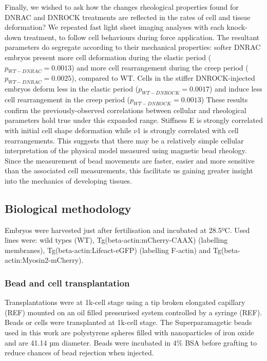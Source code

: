 Finally, we wished to ask how the changes rheological properties found for DNRAC and DNROCK treatments are reflected in the rates of cell and tissue deformation?
We repeated fast light sheet imaging analyses with each knock-down treatment, to follow cell behaviours during force application.
The resultant parameters do segregate according to their mechanical properties: softer DNRAC embryos present more cell deformation during the elastic period ($p_{WT-DNRAC} = 0.0013$) and more cell rearrangement during the creep period ($p_{WT-DNRAC} = 0.0025$), compared to WT.
Cells in the stiffer DNROCK-injected embryos deform less in the elastic period ($p_{WT-DNROCK} = 0.0017$) and induce less cell rearrangement in the creep period ($p_{WT-DNROCK} = 0.0013$) %
These results confirm the previously-observed correlations between cellular and rheological parameters hold true under this expanded range.
Stiffness E is strongly correlated with initial cell shape deformation while $\nu$1 is strongly correlated with cell rearrangements.
This suggests that there may be a relatively simple cellular interpretation of the physical model measured using magnetic bead rheology.
Since the measurement of bead movements are faster, easier and more sensitive than the associated cell measurements, this facilitate us gaining greater insight into the mechanics of developing tissues.

\subsection{Biological methodology}
Embryos were harvested just after fertilisation and incubated at 28.5ºC.
Used lines were: wild types (WT), Tg(beta-actin:mCherry-CAAX) (labelling membranes), Tg(beta-actin:Lifeact-eGFP) (labelling F-actin) and Tg(beta-actin:Myosin2-mCherry).

\subsubsection{Bead and cell transplantation}
Transplantations were at 1k-cell stage using a tip broken elongated capillary (REF) mounted on an oil filled pressurised system controlled by a syringe (REF).
Beads or cells were transplanted at 1k-cell stage.
The Superparamagetic beads used in this work are polystyrene spheres filled with nanoparticles of iron oxide and are 41.14 µm diameter.
Beads were incubated in 4\% BSA before grafting to reduce chances of bead rejection when injected.

